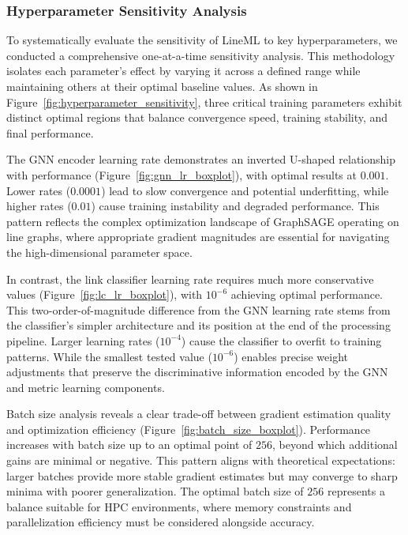 \documentclass[pdflatex,sn-mathphys-num]{sn-jnl}%
\theoremstyle{thmstyleone}%
\theoremstyle{thmstyletwo}%
\theoremstyle{thmstylethree}%
\theoremstyle{plain} %
\theoremstyle{definition} %
\theoremstyle{remark} %
\theoremstyle{plain} %
\begin{document}
\subsubsection{Hyperparameter Sensitivity Analysis}
\label{subsubsec:hyperparameter_sensitivity}

To systematically evaluate the sensitivity of LineML to key hyperparameters, we conducted a comprehensive one-at-a-time sensitivity analysis. 
This methodology isolates each parameter's effect by varying it across a defined range while maintaining others at their optimal baseline values. 
As shown in Figure~\ref{fig:hyperparameter_sensitivity}, three critical training parameters exhibit distinct optimal regions that balance convergence speed, training stability, and final performance.

The GNN encoder learning rate demonstrates an inverted U-shaped relationship with performance (Figure~\ref{fig:gnn_lr_boxplot}), with optimal results at $0.001$. 
Lower rates ($0.0001$) lead to slow convergence and potential underfitting, while higher rates ($0.01$) cause training instability and degraded performance.
This pattern reflects the complex optimization landscape of GraphSAGE operating on line graphs, where appropriate gradient magnitudes are essential for navigating the high-dimensional parameter space.

In contrast, the link classifier learning rate requires much more conservative values (Figure~\ref{fig:lc_lr_boxplot}), with $10^{-6}$ achieving optimal performance. 
This two-order-of-magnitude difference from the GNN learning rate stems from the classifier's simpler architecture and its position at the end of the processing pipeline. 
Larger learning rates ($10^{-4}$) cause the classifier to overfit to training patterns.
While the smallest tested value ($10^{-6}$) enables precise weight adjustments that preserve the discriminative information encoded by the GNN and metric learning components.

Batch size analysis reveals a clear trade-off between gradient estimation quality and optimization efficiency (Figure~\ref{fig:batch_size_boxplot}). Performance increases with batch size up to an optimal point of $256$, beyond which additional gains are minimal or negative. 
This pattern aligns with theoretical expectations: larger batches provide more stable gradient estimates but may converge to sharp minima with poorer generalization. 
The optimal batch size of $256$ represents a balance suitable for HPC environments, where memory constraints and parallelization efficiency must be considered alongside accuracy.
\end{document}
